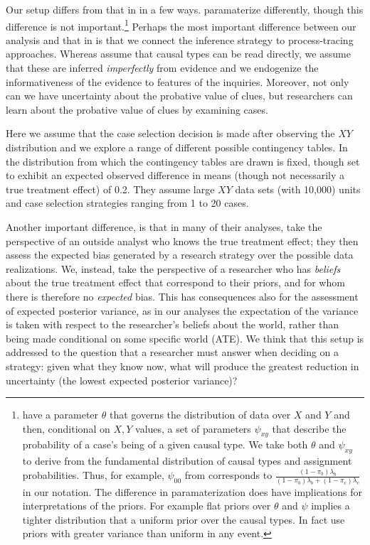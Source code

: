 \documentclass[
  12pt,
]{book}
\begin{document}
Our setup differs from that in \citet{HerronQuinn} in a few ways. \citet{HerronQuinn} paramaterize differently, though this difference is not important.\footnote{\citet{HerronQuinn} have a parameter \(\theta\) that governs the distribution of data over \(X\) and \(Y\) and then, conditional on \(X,Y\) values, a set of parameters \(\psi_{xy}\) that describe the probability of a case's being of a given causal type. We take both \(\theta\) and \(\psi_{xy}\) to derive from the fundamental distribution of causal types and assignment probabilities. Thus, for example, \(\psi_{00}\) from \citet{HerronQuinn} corresponds to \(\frac{(1-\pi_b)\lambda_b}{(1-\pi_b)\lambda_b + (1-\pi_c)\lambda_c}\) in our notation. The difference in paramaterization does have implications for interpretations of the priors. For example flat priors over \(\theta\) and \(\psi\) implies a tighter distribution that a uniform prior over the causal types. In fact \citet{HerronQuinn} use priors with greater variance than uniform in any event.} Perhaps the most important difference between our analysis and that in \citet{HerronQuinn} is that we connect the inference strategy to process-tracing approaches. Whereas \citet{HerronQuinn} assume that causal types can be read directly, we assume that these are inferred \emph{imperfectly} from evidence and we endogenize the informativeness of the evidence to features of the inquiries. Moreover, not only can we have uncertainty about the probative value of clues, but researchers can learn about the probative value of clues by examining cases.

Here we assume that the case selection decision is made after observing the \(XY\) distribution and we explore a range of different possible contingency tables. In \citet{HerronQuinn} the distribution from which the contingency tables are drawn is fixed, though set to exhibit an expected observed difference in means (though not necessarily a true treatment effect) of 0.2. They assume large \(XY\) data sets (with 10,000) units and case selection strategies ranging from 1 to 20 cases.

Another important difference, is that in many of their analyses, \citet{HerronQuinn} take the perspective of an outside analyst who knows the true treatment effect; they then assess the expected bias generated by a research strategy over the possible data realizations. We, instead, take the perspective of a researcher who has \emph{beliefs} about the true treatment effect that correspond to their priors, and for whom there is therefore no \emph{expected} bias. This has consequences also for the assessment of expected posterior variance, as in our analyses the expectation of the variance is taken with respect to the researcher's beliefs about the world, rather than being made conditional on some specific world (ATE). We think that this setup is addressed to the question that a researcher must answer when deciding on a strategy: given what they know now, what will produce the greatest reduction in uncertainty (the lowest expected posterior variance)?
\end{document}
